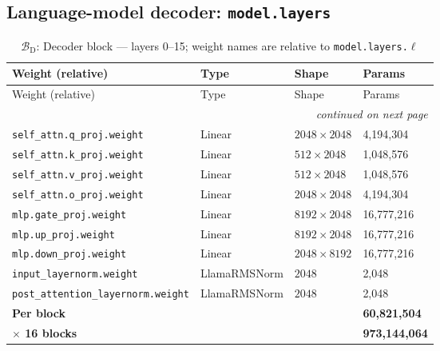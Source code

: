 \documentclass[10pt,a4paper]{article}
\theoremstyle{definition}
\begin{document}
\subsection{Language-model decoder: \texttt{model.layers}}
\begin{longtable}{p{6.6cm}>{\raggedright\arraybackslash}p{3.6cm}ll}
\caption{$\mathcal{B}_{\mathrm{D}}$: Decoder block --- layers 0--15; weight names are relative to \texttt{model.layers.$\ell$}}\\
\toprule
Weight (relative) & Type & Shape & Params \\
\midrule
\endfirsthead
\toprule
Weight (relative) & Type & Shape & Params \\
\midrule
\endhead
\midrule \multicolumn{4}{r}{\textit{continued on next page}} \\
\endfoot
\bottomrule
\endlastfoot
\texttt{self\_attn.\allowbreak{}q\_proj.\allowbreak{}weight} & Linear & $2048 \times 2048$ & 4,194,304 \\
\texttt{self\_attn.\allowbreak{}k\_proj.\allowbreak{}weight} & Linear & $512 \times 2048$ & 1,048,576 \\
\texttt{self\_attn.\allowbreak{}v\_proj.\allowbreak{}weight} & Linear & $512 \times 2048$ & 1,048,576 \\
\texttt{self\_attn.\allowbreak{}o\_proj.\allowbreak{}weight} & Linear & $2048 \times 2048$ & 4,194,304 \\
\texttt{mlp.\allowbreak{}gate\_proj.\allowbreak{}weight} & Linear & $8192 \times 2048$ & 16,777,216 \\
\texttt{mlp.\allowbreak{}up\_proj.\allowbreak{}weight} & Linear & $8192 \times 2048$ & 16,777,216 \\
\texttt{mlp.\allowbreak{}down\_proj.\allowbreak{}weight} & Linear & $2048 \times 8192$ & 16,777,216 \\
\texttt{input\_layernorm.\allowbreak{}weight} & Llama\allowbreak{}RMSNorm & $2048$ & 2,048 \\
\texttt{post\_attention\_layernorm.\allowbreak{}weight} & Llama\allowbreak{}RMSNorm & $2048$ & 2,048 \\
\midrule \textbf{Per block} & & & \textbf{60,821,504} \\
\textbf{$\times$ 16 blocks} & & & \textbf{973,144,064} \\
\end{longtable}
\end{document}
